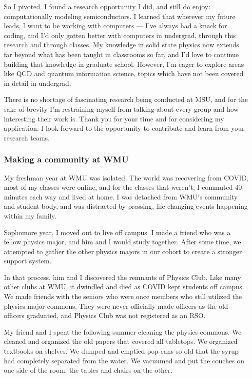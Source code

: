 \documentclass[11pt]{article}
\newcommand{\schoolabbr}{MSU}
\begin{document}
So I pivoted. I found a research opportunity I did, and still do enjoy: computationally modeling semiconductors. I learned that wherever my future leads, I want to be working with computers --- I've always had a knack for coding, and I'd only gotten better with computers in undergrad, through this research and through classes. My knowledge in solid state physics now extends far beyond what has been taught in classrooms so far, and I'd love to continue building that knowledge in graduate school. However, I'm eager to explore areas like QCD and quantum information science, topics which have not been covered in detail in undergrad.

There is no shortage of fascinating research being conducted at \schoolabbr{}, and for the sake of brevity I'm restraining myself from talking about every group and how interesting their work is. Thank you for your time and for considering my application. I look forward to the opportunity to contribute and learn from your research teams.

\subsubsection*{Making a community at WMU}
My freshman year at WMU was isolated. The world was recovering from COVID, most of my classes were online, and for the classes that weren't, I commuted 40 minutes each way and lived at home. I was detached from WMU's community and student body, and was distracted by pressing, life-changing events happening within my family.

Sophomore year, I moved out to live off campus. I made a friend who was a fellow physics major, and him and I would study together. After some time, we attempted to gather the other physics majors in our cohort to create a stronger support system.

In that process, him and I discovered the remnants of Physics Club. Like many other clubs at WMU, it dwindled and died as COVID kept students off campus. We made friends with the seniors who were once members who still utilized the physics major commons. They were never officially made officers as the old officers graduated, and Physics Club was not registered as an RSO.

My friend and I spent the following summer cleaning the physics commons. We cleaned and organized the old papers that covered all tabletops. We organized textbooks on shelves. We dumped and emptied pop cans so old that the syrup had completely separated from the water. We vacuumed and put the couches on one side of the room, the tables and chairs on the other.
\end{document}
